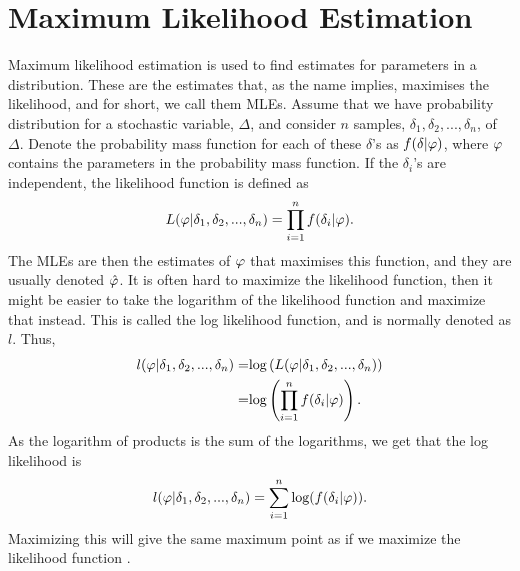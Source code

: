 \section{Maximum Likelihood Estimation}
\label{section_theory_mle}

Maximum likelihood estimation is used to find estimates for parameters in a distribution. These are the estimates that, as the name implies, maximises the likelihood, and for short, we call them MLEs. Assume that we have probability distribution for a stochastic variable, $\Delta$, and consider $n$ samples, $\delta_1,\delta_2,...,\delta_n$, of $\Delta$. Denote the probability mass function for each of these $\delta$'s as $f(\delta|\varphi)$, where $\varphi$ contains the parameters in the probability mass function. If the $\delta_i$'s are independent, the likelihood function is defined as
\begin{equation}
\label{likelihood}
    L(\varphi|\delta_1,\delta_2,...,\delta_n) =  \prod_{i=1}^{n} f(\delta_i|\varphi).
\end{equation} 
The MLEs are then the estimates of $\varphi$ that maximises this function, and they are usually denoted $\hat{\varphi}$. It is often hard to maximize the likelihood function, then it might be easier to take the logarithm of the likelihood function and maximize that instead. This is called the log likelihood function, and is normally denoted as $l$. Thus,
\begin{equation}
\label{chap2:log_likelihood}
    \begin{aligned}
        l(\varphi|\delta_1,\delta_2,...,\delta_n) 
        =& \text{log}\left(L(\varphi|\delta_1,\delta_2,...,\delta_n)\right)\\
        =& \text{log}\left(\prod_{i=1}^{n} f(\delta_i|\varphi) \right).
    \end{aligned}
\end{equation}
As the logarithm of products is the sum of the logarithms, we get that the log likelihood is
\begin{equation}
\label{chap2:log_likelihood2}
    \begin{aligned}
        l(\varphi|\delta_1,\delta_2,...,\delta_n) = \sum_{i=1}^n \text{log}(f(\delta_i|\varphi)).
    \end{aligned}
\end{equation}
Maximizing this will give the same maximum point as if we maximize the likelihood function \citep{statinf}. 

